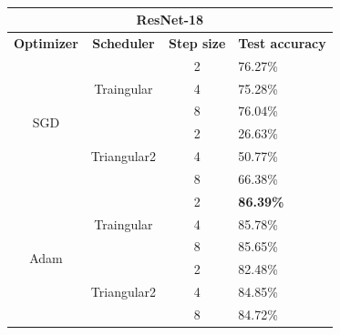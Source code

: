 \begin{table}[ht!]
\centering
\caption{}
\label{tab:my-table}
\begin{tabular}{|ccll|}
\hline
\multicolumn{4}{|c|}{\textbf{ResNet-18}}                                          \\ \hline
\multicolumn{1}{|c|}{\textbf{Optimizer}}    & \multicolumn{1}{c|}{\textbf{Scheduler}}           & \multicolumn{1}{c|}{\textbf{Step size}} & \textbf{Test accuracy} \\ \hline
\multicolumn{1}{|c|}{\multirow{6}{*}{SGD}}  & \multicolumn{1}{c|}{\multirow{3}{*}{Traingular}}  & \multicolumn{1}{c|}{2}                  &  76.27\%                \\ \cline{3-4} 
\multicolumn{1}{|c|}{} & \multicolumn{1}{c|}{} & \multicolumn{1}{c|}{4} & 75.28\% \\ \cline{3-4} 
\multicolumn{1}{|c|}{} & \multicolumn{1}{c|}{} & \multicolumn{1}{c|}{8} & 76.04\% \\ \cline{2-4} 
\multicolumn{1}{|c|}{}                      & \multicolumn{1}{c|}{\multirow{3}{*}{Triangular2}} & \multicolumn{1}{c|}{2}                  &  26.63\%               \\ \cline{3-4} 
\multicolumn{1}{|c|}{} & \multicolumn{1}{c|}{} & \multicolumn{1}{c|}{4} & 50.77\% \\ \cline{3-4} 
\multicolumn{1}{|c|}{} & \multicolumn{1}{c|}{} & \multicolumn{1}{c|}{8} & 66.38\% \\ \hline
\multicolumn{1}{|c|}{\multirow{6}{*}{Adam}} & \multicolumn{1}{c|}{\multirow{3}{*}{Traingular}}  & \multicolumn{1}{c|}{2}                  & \textbf{86.39\%}       \\ \cline{3-4} 
\multicolumn{1}{|c|}{} & \multicolumn{1}{c|}{} & \multicolumn{1}{c|}{4} & 85.78\% \\ \cline{3-4} 
\multicolumn{1}{|c|}{} & \multicolumn{1}{c|}{} & \multicolumn{1}{c|}{8} & 85.65\% \\ \cline{2-4} 
\multicolumn{1}{|c|}{}                      & \multicolumn{1}{c|}{\multirow{3}{*}{Triangular2}} & \multicolumn{1}{c|}{2}                  & 82.48\%                \\ \cline{3-4} 
\multicolumn{1}{|c|}{} & \multicolumn{1}{c|}{} & \multicolumn{1}{c|}{4} & 84.85\% \\ \cline{3-4} 
\multicolumn{1}{|c|}{} & \multicolumn{1}{c|}{} & \multicolumn{1}{c|}{8} & 84.72\% \\ \hline
\end{tabular}
\end{table}




